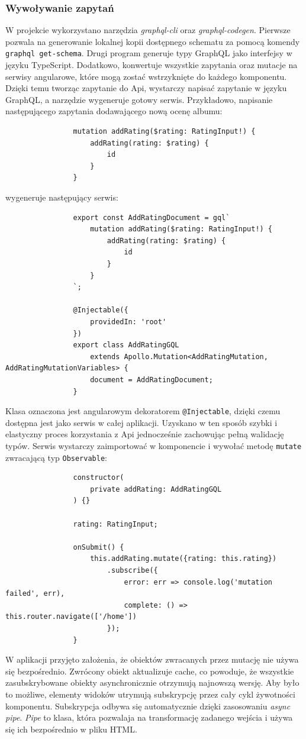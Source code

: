 		\subsubsection*{Wywoływanie zapytań}
			W projekcie wykorzystano narzędzia \emph{graphql-cli} oraz \emph{graphql-codegen}.
			Pierwsze pozwala na generowanie lokalnej kopii dostępnego schematu za pomocą komendy \verb|graphql get-schema|.
			Drugi program generuje typy GraphQL jako interfejsy w języku TypeScript.
			Dodatkowo, konwertuje wszystkie zapytania oraz mutacje na serwisy angularowe, które mogą zostać wstrzyknięte do każdego komponentu.
			Dzięki temu tworząc zapytanie do Api, wystarczy napisać zapytanie w języku GraphQL, a narzędzie wygeneruje gotowy serwis.
			Przykładowo, napisanie następującego zapytania dodawającego nową ocenę albumu:
			\begin{lstlisting}
				mutation addRating($rating: RatingInput!) {
					addRating(rating: $rating) {
						id
					}
				}
			\end{lstlisting}
			wygeneruje następujący serwis:
			\begin{lstlisting}
				export const AddRatingDocument = gql`
					mutation addRating($rating: RatingInput!) {
						addRating(rating: $rating) {
							id
						}
					}
				`;
				
				@Injectable({
					providedIn: 'root'
				})
				export class AddRatingGQL
					extends Apollo.Mutation<AddRatingMutation, AddRatingMutationVariables> {
					document = AddRatingDocument;
				}
			\end{lstlisting}

			Klasa oznaczona jest angularowym dekoratorem \verb|@Injectable|, dzięki czemu dostępna jest jako serwis w całej aplikacji.
			Uzyskano w ten sposób szybki i elastyczny proces korzystania z Api jednocześnie zachowując pełną walidację typów.
			Serwis wystarczy zaimportować w komponencie i wywołać metodę \verb|mutate| zwracającą typ \verb|Observable|:
			\begin{lstlisting}
				constructor(
					private addRating: AddRatingGQL
				) {}

				rating: RatingInput;

				onSubmit() {
					this.addRating.mutate({rating: this.rating})
						.subscribe({
							error: err => console.log('mutation failed', err),
							complete: () => this.router.navigate(['/home'])
						});
				}
			\end{lstlisting}

			W aplikacji przyjęto założenia, że obiektów zwracanych przez mutację nie używa się bezpośrednio.
			Zwrócony obiekt aktualizuje cache, co powoduje, że wszystkie zasubskrybowane obiekty asynchronicznie otrzymują najnowszą wersję.
			Aby było to możliwe, elementy widoków utrymują subskrypcję przez cały cykl żywotności komponentu.
			Subskrypcja odbywa się automatycznie dzięki zasosowaniu \emph{async pipe}.
			\emph{Pipe} to klasa, która pozwalaja na transformację zadanego wejścia i używa się ich bezpośrednio w pliku HTML.
			
